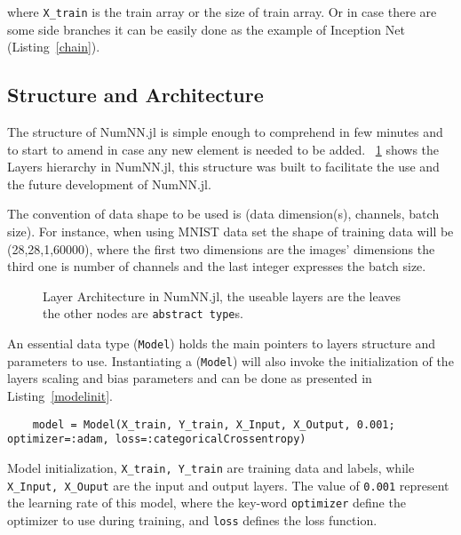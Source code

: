 where \texttt{X_train} is the train array or the size of train array. Or in case there are some side branches it can be easily done as the example of Inception Net \cite{Szegedy2016} (Listing~\ref{chain}). 


\subsection{Structure and Architecture}\label{subsec:saa}

The structure of NumNN.jl is simple enough to comprehend in few minutes and to start to amend in case any new element is needed to be added. \figurename~\ref{fig:layerstruct} shows the Layers hierarchy in NumNN.jl, this structure was built to facilitate the use and the future development of NumNN.jl.

The convention of data shape to be used is (data dimension(s), channels, batch size). For instance, when using MNIST \cite{LeCun1998,LeCun1998a} data set the shape of training data will be (28,28,1,60000), where the first two dimensions are the images' dimensions the third one is number of channels and the last integer expresses the batch size.

\begin{figure}[!ht]
	\centering
		
	\caption{Layer Architecture in NumNN.jl, the useable layers are the leaves the other nodes are \texttt{abstract type}s.}\label{fig:layerstruct}
\end{figure}

An essential data type (\texttt{Model}) holds the main pointers to layers structure and parameters to use. Instantiating a (\texttt{Model}) will also invoke the initialization of the layers scaling and bias parameters and can be done as presented in Listing~\ref{modelinit}.

\begin{listing}[H]
	\begin{verbatim}
	model = Model(X_train, Y_train, X_Input, X_Output, 0.001; optimizer=:adam, loss=:categoricalCrossentropy)
	\end{verbatim}
	\caption{Model initialization, \texttt{X_train, Y_train} are training data and labels, while \texttt{X_Input, X_Ouput} are the input and output layers. The value of \texttt{0.001} represent the learning rate of this model, where the key-word \texttt{optimizer} define the optimizer to use during training, and \texttt{loss} defines the loss function.}\label{modelinit}
\end{listing}

